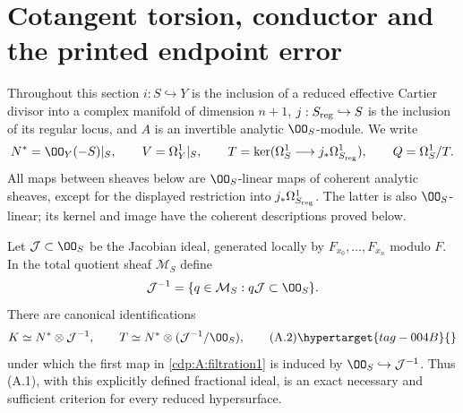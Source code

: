 \section{Cotangent torsion, conductor and the printed endpoint error}\hypertarget{tag-0340}{}\label{sec:II:04}


Throughout this section $i:S\hookrightarrow Y$ is the inclusion of a reduced effective Cartier divisor into a complex manifold of dimension $n+1$, $j:S_{\rm reg}\hookrightarrow S$ is the inclusion of its regular locus, and $A$ is an invertible analytic $\OO_S$-module. We write
\[
 N^*=\OO_Y(-S)|_S,\qquad V=\Omega_Y^1|_S,\qquad
 T=\ker(\Omega_S^1\longrightarrow j_*\Omega^1_{S_{\rm reg}}),\qquad Q=\Omega_S^1/T.
\]
All maps between sheaves below are $\OO_S$-linear maps of coherent analytic sheaves, except for the displayed restriction into $j_*\Omega^1_{S_{\rm reg}}$. The latter is also $\OO_S$-linear; its kernel and image have the coherent descriptions proved below.


\begin{proposition}\hypertarget{tag-01AF}{}\label{cdp:st:A.2.1}


Let $\mathcal J\subset\OO_S$ be the Jacobian ideal, generated locally by $F_{x_0},\ldots,F_{x_n}$ modulo $F$. In the total quotient sheaf $\mathcal M_S$ define
\[
 \mathcal J^{-1}=\{q\in\mathcal M_S:q\mathcal J\subset\OO_S\}.
\]
There are canonical identifications
\[
 K\simeq N^*\otimes\mathcal J^{-1},\qquad
 T\simeq N^*\otimes(\mathcal J^{-1}/\OO_S),
\tag{A.2}\hypertarget{tag-004B}{}\label{cdp:eq:A.2}
\]
under which the first map in \eqref{cdp:A:filtration1} is induced by $\OO_S\hookrightarrow\mathcal J^{-1}$. Thus (A.1), with this explicitly defined fractional ideal, is an exact necessary and sufficient criterion for every reduced hypersurface.
\end{proposition}








